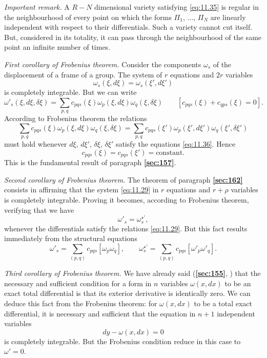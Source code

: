 \documentclass[leqno,11pt]{book}
\numberwithin{equation}{chapter}
\theoremstyle{shape1}
\theoremstyle{shapesmall}
\newcommand{\fsref}[1]{{\rm\textsection\textbf{\ref{sec:#1}}}}
\newcommand{\somespace}{\vspace{9pt}}
\begin{document}
\somespace

\emph{Important remark.} A $R-N$ dimensional variety satisfying \eqref{eq:11.35} is regular in the neighbourhood of every point on which the forms $\Pi_{1}$, $\dots$, $\Pi_{N}$ are linearly independent with respect to their differentials. Such a variety cannot cut itself. But, considered in its totality, it can pass through the neighbourhood of the same point an infinite number of times.

\somespace

\emph{First corollary of Frobenius theorem.} Consider the components $\omega_{s}$ of the displacement of a frame of a group. The system of $r$ equations and $2r$ variables
\begin{equation}
  \label{eq:11.36}
  \omega_{s}(\xi,d\xi)=\omega_{s}(\xi',d\xi')
\end{equation}
is completely integrable. But we can write
\[
\omega'_{s}(\xi,d\xi,\delta\xi)=\sum_{p,q}c_{pqs}(\xi)\omega_{p}(\xi,d\xi)\omega_{q}(\xi,\delta\xi)\qquad[c_{pqs}(\xi)+c_{qps}(\xi)=0].
\]
According to Frobenius theorem the relations
\[
\sum_{p,q}c_{pqs}(\xi)\omega_{p}(\xi,d\xi)\omega_{q}(\xi,\delta\xi)=\sum_{p,q}c_{pqs}(\xi')\omega_{p}(\xi',d\xi')\omega_{q}(\xi',\delta\xi')
\]
must hold whenever $d\xi$, $d\xi'$, $\delta\xi$, $\delta\xi'$ satisfy the equations \eqref{eq:11.36}. Hence
\[
c_{pqs}(\xi)=c_{pqs}(\xi')=\text{constant}.
\]
This is the fundamental result of paragraph \fsref{157}.

\somespace

\emph{Second corollary of Frobenius theorem.} The theorem of paragraph \fsref{162} consists in affirming that the system \eqref{eq:11.29} in $r$ equations and $r+\rho$ variables is completely integrable. Proving it becomes, according to Frobenius theorem, verifying that we have
\[
\omega'_{s}=\omega^{\star\prime}_{s},
\]
whenever the differentials satisfy the relations \eqref{eq:11.29}. But this fact results immediately from the structural equations
\[
\omega'_{s}=\sum_{(p,q)}c_{pqs}[\omega_{p}\omega_{q}],\qquad
\omega^{\star\prime}_{s}=\sum_{(p,q)}c_{pqs}[\omega'_{p}\omega'_{q}].
\]

\emph{Third corollary of Frobenius theorem.} We have already said (\fsref{155}, \pageref{sec:155}) that the necessary and sufficient condition for a form in $n$ variables $\omega(x,dx)$ to be an exact total differential is that its exterior derivative is identically zero. We can deduce this fact from the Frobenius theorem: for $\omega(x,dx)$ to be a total exact differential, it is necessary and sufficient that the equation in $n+1$ independent variables
\[
dy-\omega(x,dx)=0
\]
is completely integrable. But the Frobenius condition reduce in this case to $\omega'=0$.
\end{document}
